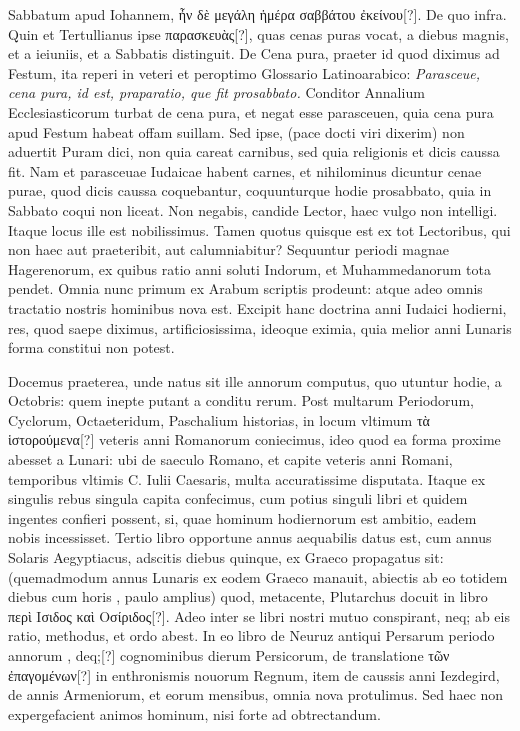 Sabbatum apud Iohannem, \textgreek{ἦν δὲ μεγάλη ἡμέρα σαββάτου
ἐκείνου[?]}.
De quo infra.
Quin et Tertullianus ipse \textgreek{παρασκευὰς[?]},
quas cenas puras vocat, a diebus magnis, et a ieiuniis, et a
Sabbatis distinguit.
De Cena pura, praeter id quod diximus ad
Festum, ita reperi in veteri et peroptimo Glossario Latinoarabico:
\textit{Parasceue, cena pura, id est, praparatio, que fit prosabbato.}
Conditor Annalium Ecclesiasticorum turbat de cena
pura, et negat esse parasceuen, quia cena pura apud Festum
habeat offam suillam.
Sed ipse, (pace docti viri dixerim) non
aduertit Puram dici, non quia careat carnibus, sed quia religionis
et dicis caussa fit.
Nam et parasceuae Iudaicae habent carnes,
et nihilominus dicuntur cenae purae, quod dicis caussa coquebantur,
coquunturque hodie prosabbato, quia in Sabbato
coqui non liceat.
Non negabis, candide Lector, haec vulgo non intelligi.
Itaque locus ille est nobilissimus. 
Tamen quotus quisque est ex tot Lectoribus, qui non haec
 aut praeteribit,
aut calumniabitur?
Sequuntur periodi magnae Hagerenorum,
ex quibus ratio anni soluti Indorum, et Muhammedanorum
tota pendet.
Omnia nunc primum ex Arabum scriptis
prodeunt: atque adeo omnis tractatio nostris hominibus
nova est.
Excipit hanc doctrina anni Iudaici hodierni, res, quod
saepe diximus, artificiosissima, ideoque eximia, quia melior
anni Lunaris forma constitui non potest.

Docemus praeterea, unde
natus sit ille annorum computus, quo utuntur hodie, a  Octobris:
quem inepte putant a conditu rerum.
Post multarum Periodorum,
Cyclorum, Octaeteridum, Paschalium historias, in locum vltimum
\textgreek{τὰ ἱστορούμενα[?]} veteris anni Romanorum coniecimus, ideo
quod ea forma proxime abesset a Lunari: ubi de saeculo Romano,
et capite veteris anni Romani, temporibus vltimis C. Iulii Caesaris,
multa accuratissime disputata.
Itaque ex singulis rebus singula capita
confecimus, cum potius singuli libri et quidem ingentes confieri
possent, si, quae hominum hodiernorum est ambitio, eadem nobis
incessisset.
Tertio libro opportune annus aequabilis datus est,
cum annus Solaris Aegyptiacus, adscitis diebus quinque, ex Graeco
propagatus sit: (quemadmodum annus Lunaris ex eodem Graeco
manauit, abiectis ab eo totidem diebus cum horis , paulo amplius)
quod, metacente, Plutarchus docuit in libro
 \textgreek{περὶ Ισιδος καὶ Οσίριδος[?]}.
Adeo inter se libri nostri mutuo conspirant, neq; ab eis ratio,
methodus, et ordo abest.
In eo libro de Neuruz antiqui Persarum
periodo annorum , deq;[?] cognominibus dierum Persicorum,
de translatione \textgreek{τῶν ἐπαγομένων[?]} in enthronismis nouorum Regnum,
item de caussis anni Iezdegird, de annis Armeniorum, et eorum
mensibus, omnia nova protulimus. 
Sed haec non expergefacient animos
hominum, nisi forte ad obtrectandum.

